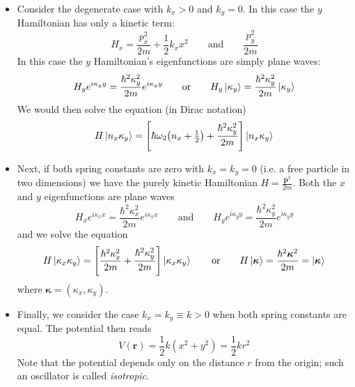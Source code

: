 \documentclass[11pt, a4paper]{article}
\newcommand{\eqtext}[1]{\qquad \text{#1} \qquad}
\renewcommand{\vec}[1]{\bm{#1}} %
\begin{document}
\begin{itemize}
	\item Consider the degenerate case with $ k_{x} > 0 $ and $ k_{y} = 0 $. In this case the $ y $ Hamiltonian has only a kinetic term:
	\begin{equation*}
		H_{x} = \frac{p_{x}^{2}}{2m} + \frac{1}{2}k_{x}x^{2} \eqtext{and} \frac{p_{y}^{2}}{2m}
	\end{equation*}
	In this case the $ y $ Hamiltonian's eigenfunctions are simply plane waves:
	\begin{equation*}
		H_{y}e^{i\kappa_{y}y} = \frac{\hbar^{2}\kappa_{y}^{2}}{2m}e^{i\kappa_{y}y} \eqtext{or} H_{y}\ket{\kappa_{y}} = \frac{\hbar^{2}\kappa_{y}^{2}}{2m}\ket{\kappa_{y}}
	\end{equation*}
	We would then solve the equation (in Dirac notation)
	\begin{equation*}
		H\ket{n_{x}\kappa_{y}} = \left[\hbar \omega_{2}\big(n_{x} + \tfrac{1}{2}\big) + \frac{\hbar^{2}\kappa_{y}^{2}}{2m}\right]\ket{n_{x}\kappa_{y}}
	\end{equation*}
	
	\item Next, if both spring constants are zero with $ k_{x} = k_{y} = 0 $ (i.e. a free particle in two dimensions) we have the purely kinetic Hamiltonian $ H = \frac{\vec{p}^{2}}{2m} $. Both the $ x $ and $ y $ eigenfunctions are plane waves
	\begin{equation*}
		H_{x}e^{i\kappa_{x}x} = \frac{\hbar^{2}\kappa_{x}^{2}}{2m}e^{i\kappa_{x}x} \eqtext{and} H_{y}e^{i\kappa_{y}y} = \frac{\hbar^{2}\kappa_{y}^{2}}{2m}e^{i\kappa_{y}y}
	\end{equation*}
	and we solve the equation 
	\begin{equation*}
		H\ket{\kappa_{x}\kappa_{y}} = \left[\frac{\hbar^{2}\kappa_{x}^{2}}{2m} + \frac{\hbar^{2}\kappa_{y}^{2}}{2m}\right]\ket{\kappa_{x}\kappa_{y}} \eqtext{or} H\ket{\vec{\kappa}} = \frac{\hbar^{2}\vec{\kappa}^{2}}{2m} = \ket{\vec{\kappa}}
	\end{equation*}
	where $ \vec{\kappa} = (\kappa_{x}, \kappa_{y}) $.
	
	\item Finally, we consider the case $ k_{x} = k_{y} \equiv k > 0 $ when both spring constants are equal. The potential then reads
	\begin{equation*}
		V(\vec{r}) = \frac{1}{2}k(x^{2} + y^{2}) = \frac{1}{2}kr^{2}
	\end{equation*}
	Note that the potential depends only on the distance $ r $ from the origin; such an oscillator is called \textit{isotropic}. 
	

\end{itemize}
\end{document}
